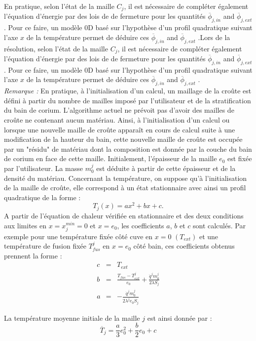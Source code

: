 En pratique, selon l'état de la maille $C_j$, il est nécessaire de compléter également l'équation d'énergie par des lois de de fermeture pour les quantités $\overline{\phi}_{j,in}$ and $\overline{\phi}_{j,ext}$. Pour ce faire, un modèle 0D basé sur l'hypothèse d'un profil quadratique suivant l'axe $x$ de la température permet de déduire ces $\overline{\phi}_{j,in}$ and $\overline{\phi}_{j,ext}$ \cite{LeTellier2016}.Lors de la résolution, selon l'état de la maille $C_j$, il est nécessaire de compléter également l'équation d'énergie par des lois de de fermeture pour les quantités $\overline{\phi}_{j,in}$ and $\overline{\phi}_{j,ext}$. Pour ce faire, un modèle 0D basé sur l'hypothèse d'un profil quadratique suivant l'axe $x$ de la température permet de déduire ces $\overline{\phi}_{j,in}$ and $\overline{\phi}_{j,ext}$ \cite{LeTellier2016}.\\

{\it Remarque :}
En pratique, à l'initialisation d'un calcul, un maillage de la croûte est défini à partir du nombre de mailles imposé par l'utilisateur et de la stratification du bain de corium. L'algorithme actuel ne prévoit pas d'avoir des mailles de croûte ne contenant aucun matériau. Ainsi, à l'initialisation d'un calcul ou lorsque une nouvelle maille de croûte apparaît en cours de calcul suite à une modification de la hauteur du bain, cette nouvelle maille de croûte est occupée par un "résidu" de matériau dont la composition est donnée par la couche du bain de corium en face de cette maille. Initialement, l'épaisseur de la maille $e_0$ est fixée par l'utilisateur. La masse $m_0^j$ est déduite à partir de cette épaisseur et de la densité du matériau. Concernant la température, on suppose qu'à l'initialisation de la maille de croûte, elle correspond à un état stationnaire avec ainsi un profil quadratique de la forme : 
$$T_j(x)=ax^2+bx+c.$$
A partir de l'équation de chaleur vérifiée en stationnaire et des deux conditions aux limites en $x=x_j^{min}=0$ et $x=e_0$, les coefficients $a$, $b$ et $c$ sont calculés. Par exemple pour une température fixée côté cuve en $x=0$ $(T_{ext})$ et une température de fusion fixée $T_{fus}^j$ en $x=e_0$ côté bain, ces coefficients obtenus prennent la forme :
\begin{eqnarray}
c &=& T_{ext} \\
b &=& \frac{T_{fus}-T_{ext}^j}{e_0}+\frac{\dot{q}^j m_0^j}{2\lambda S_j} \\
a &=& -\frac{\dot{q}^j m_0^j}{2\lambda^j e_0 S_j}
\end{eqnarray}

La température moyenne initiale de la maille $j$ est ainsi donnée par :
$$\overline{T}_{j}=\frac{a}{3} e_0^2 + \frac{b}{2} e_0 + c$$

